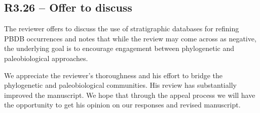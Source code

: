 \documentclass[11pt]{article}
\newcommand{\response}[1]{\noindent\textcolor{resp}{#1}\medskip}
\begin{document}
\subsection*{R3.26 -- Offer to discuss}

The reviewer offers to discuss the use of stratigraphic databases for refining PBDB occurrences and notes that while the review may come across as negative, the underlying goal is to encourage engagement between phylogenetic and paleobiological approaches.

\response{We appreciate the reviewer's thoroughness and his effort to bridge the phylogenetic and paleobiological communities. His review has substantially improved the manuscript. We hope that through the appeal process we will have the opportunity to get his opinion on our responses and revised manuscript.}
\end{document}
